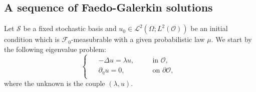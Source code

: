 \documentclass[10pt,number,preprint,times]{elsarticle}
\numberwithin{equation}{section} %
\begin{document}
\subsection{A sequence of Faedo-Galerkin solutions}
Let $\mathcal{S}$ be a fixed stochastic basis and $u_0 \in \mathcal{L}^2(\Omega;L^2(\mathcal{O}))$ be an initial condition which is $\mathcal{F}_0$-measubrable with a given probabilistic law $\mu$. We start by the following eigenvalue problem:
\begin{equation}\label{eigen}
\begin{cases}
	\begin{split}
	&-\Delta u =\lambda u, \quad &&\text{in } \mathcal{O}, \\
	&\partial_\eta u=0, \quad &&\text{on } \partial \mathcal{O},
	\end{split}
\end{cases}
\end{equation}
where the unknown is the couple $(\lambda,u)$. 
\end{document}
